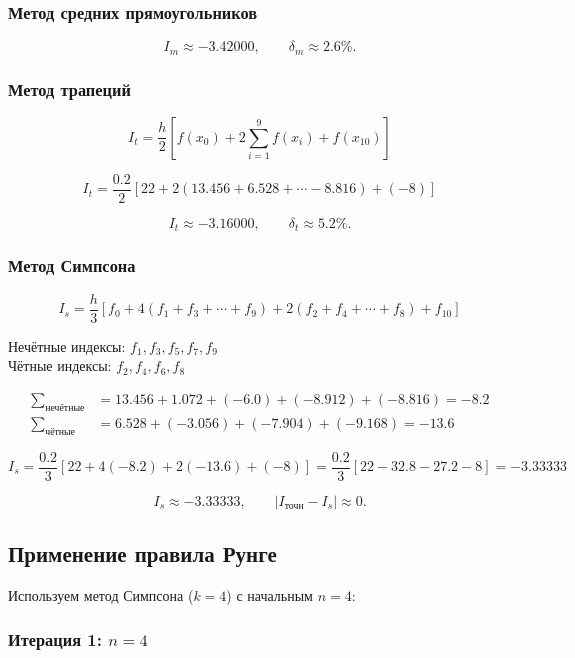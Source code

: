 \documentclass[a4paper,12pt]{article}
\begin{document}
\subsubsection*{Метод средних прямоугольников}

\[
I_m \approx -3.42000, \qquad \delta_m \approx 2.6\%.
\]

\subsubsection*{Метод трапеций}

\[
I_t = \frac{h}{2}[f(x_0) + 2\sum_{i=1}^{9} f(x_i) + f(x_{10})]
\]

\[
I_t = \frac{0.2}{2}[22 + 2(13.456 + 6.528 + \cdots - 8.816) + (-8)]
\]

\[
I_t \approx -3.16000, \qquad \delta_t \approx 5.2\%.
\]

\subsubsection*{Метод Симпсона}

\[
I_s = \frac{h}{3}[f_0 + 4(f_1 + f_3 + \cdots + f_9) + 2(f_2 + f_4 + \cdots + f_8) + f_{10}]
\]

Нечётные индексы: $f_1, f_3, f_5, f_7, f_9$ \\
Чётные индексы: $f_2, f_4, f_6, f_8$

\begin{align*}
\sum_{\text{нечётные}} &= 13.456 + 1.072 + (-6.0) + (-8.912) + (-8.816) = -8.2 \\
\sum_{\text{чётные}} &= 6.528 + (-3.056) + (-7.904) + (-9.168) = -13.6
\end{align*}

\[
I_s = \frac{0.2}{3}[22 + 4(-8.2) + 2(-13.6) + (-8)] = \frac{0.2}{3}[22 - 32.8 - 27.2 - 8] = -3.33333
\]

\[
I_s \approx -3.33333, \qquad |I_{\text{точн}}-I_s|\approx0.
\]

\newpage

\subsection{Применение правила Рунге}

Используем метод Симпсона ($k = 4$) с начальным $n = 4$:

\subsubsection*{Итерация 1: $n = 4$}
\end{document}
